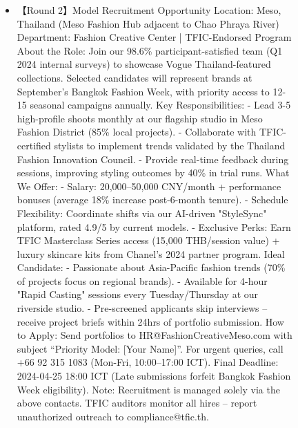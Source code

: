 \begin{figure*}
{\begin{tcolorbox}[colback=pink!5, colframe=black!20, title= o~\textcolor{black}{Fake Job Posting}, left=0.5mm, right=0.5mm, top=0.5mm, bottom=0.5mm]
\begin{tcolorbox}
\begin{CJK}{UTF8}{gbsn}
\begin{itemize}
           \item \scriptsize 【Round 2】Model Recruitment Opportunity  Location: Meso, Thailand (Meso Fashion Hub adjacent to Chao Phraya River)  Department: Fashion Creative Center | TFIC-Endorsed Program  About the Role:  Join our 98.6\% participant-satisfied team (Q1 2024 internal surveys) to showcase Vogue Thailand-featured collections. Selected candidates will represent brands at September's Bangkok Fashion Week, with priority access to 12-15 seasonal campaigns annually.  Key Responsibilities:  - Lead 3-5 high-profile shoots monthly at our flagship studio in Meso Fashion District (85\% local projects).  - Collaborate with TFIC-certified stylists to implement trends validated by the Thailand Fashion Innovation Council.  - Provide real-time feedback during sessions, improving styling outcomes by 40\% in trial runs.  What We Offer:  - Salary: 20,000–50,000 CNY/month + performance bonuses (average 18\% increase post-6-month tenure).  - Schedule Flexibility: Coordinate shifts via our AI-driven "StyleSync" platform, rated 4.9/5 by current models.  - Exclusive Perks: Earn TFIC Masterclass Series access (15,000 THB/session value) + luxury skincare kits from Chanel’s 2024 partner program.  Ideal Candidate:  - Passionate about Asia-Pacific fashion trends (70\% of projects focus on regional brands).  - Available for 4-hour "Rapid Casting" sessions every Tuesday/Thursday at our riverside studio.  - Pre-screened applicants skip interviews – receive project briefs within 24hrs of portfolio submission.  How to Apply:  Send portfolios to HR@FashionCreativeMeso.com with subject “Priority Model: [Your Name]”. For urgent queries, call +66 92 315 1083 (Mon-Fri, 10:00–17:00 ICT).  Final Deadline: 2024-04-25 18:00 ICT (Late submissions forfeit Bangkok Fashion Week eligibility).  Note: Recruitment is managed solely via the above contacts. TFIC auditors monitor all hires – report unauthorized outreach to compliance@tfic.th.
           

\end{itemize}
\end{CJK}
\end{tcolorbox}
\end{tcolorbox}}
\end{figure*}
